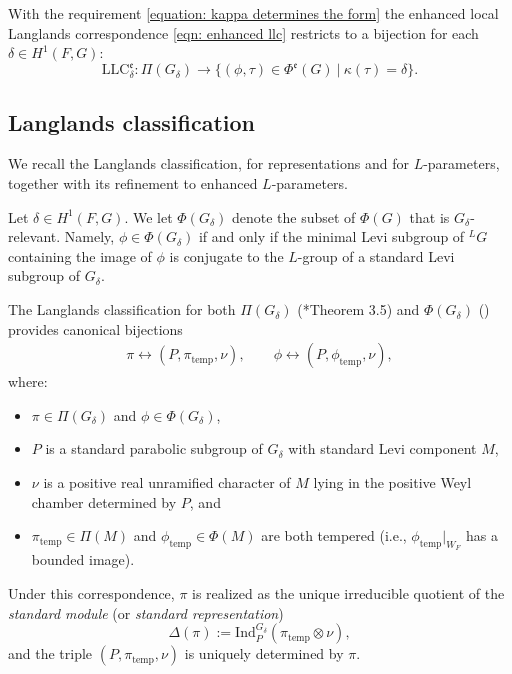 \documentclass[11pt,letterpaper]{amsart}
\newcommand{\Ind}{\mathrm{Ind}}
\newcommand{\LLC}{\mathrm{LLC}}
\newcommand{\temp}{\mathrm{temp}}
\renewcommand{\1}{\mathbbm{1}}
\numberwithin{equation}{section}
\begin{document}
{With the requirement \eqref{equation: kappa determines the form} the enhanced local Langlands correspondence \eqref{eqn: enhanced llc} restricts to a bijection for each $\delta \in H^1(F,G)$: 
\begin{equation}\label{equation: llc delta}
    \LLC^{\mathfrak{e}}_{\delta}: \Pi(G_{\delta}) \to \{ (\phi, \tau) \in \Phi^\mathfrak{e}(G) \ \vert\  \kappa(\tau)=\delta \}.
\end{equation}



\subsection{Langlands classification}\label{subsec: Langlands classification}
We recall the Langlands classification, for representations and for $L$-parameters, together with its refinement to enhanced $L$-parameters.

Let $\delta\in H^1(F,G)$. We let $\Phi(G_{\delta})$ denote the subset of $\Phi(G)$ that is $G_{\delta}$-relevant. Namely, $\phi \in \Phi(G_{\delta})$ if and only if the minimal Levi subgroup of ${}^LG$ containing the image of $\phi$ is conjugate to the $L$-group of a standard Levi subgroup of $G_{\delta}$.

The Langlands classification for both $\Pi(G_{\delta})$ (\cite{Kon03}*{Theorem 3.5}) and $\Phi(G_{\delta})$ (\cite{SZ18}) provides canonical bijections
\begin{align*}
    \pi \leftrightarrow (P, \pi_\temp, \nu), \qquad \phi \leftrightarrow (P, \phi_\temp, \nu),
\end{align*}
where:
\begin{itemize}
    \item $\pi \in \Pi(G_{\delta})$ and $\phi \in \Phi(G_{\delta})$, 
    \item $P$ is a standard parabolic subgroup of $G_{\delta}$ with standard Levi component $M$,
    \item $\nu$ is a positive real unramified character of $M$ lying in the positive Weyl chamber determined by $P$, and
    \item $\pi_\temp \in \Pi(M)$ and $\phi_\temp \in \Phi(M)$ are both tempered (i.e., $\phi_\temp|_{W_F}$ has a bounded image).
\end{itemize}



Under this correspondence, $\pi$ is realized as the unique irreducible quotient of the \emph{standard module} (or \emph{standard representation})
\[
\Delta(\pi):=\Ind_P^{G_{\delta}}(\pi_\temp \otimes \nu),
\]
and the triple $(P,\pi_\temp,\nu)$ is uniquely determined by $\pi$.

}
\end{document}
